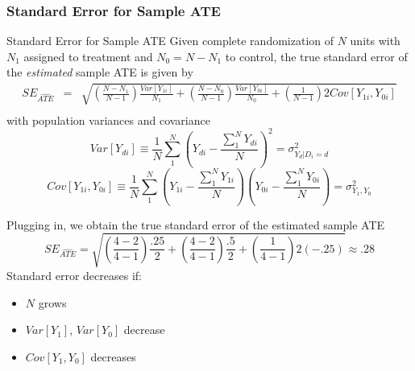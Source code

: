 \documentclass{beamer}
\numberwithin{equation}{section}
\begin{document}
\begin{frame}
  \frametitle{Standard Error for Sample ATE}


\scriptsize
\begin{block}{Standard Error for Sample ATE}
Given complete randomization of $N$ units with $N_1$ assigned to treatment and $N_0=N-N_1$ to control, the true standard error of the \emph{estimated} sample ATE is given by
 \begin{eqnarray*}
 SE_{\widehat{ATE}}&=&\sqrt{ \left( \frac{N-N_1}{N-1}\right) \frac{Var[Y_{1i}]}{N_1}+ \left( \frac{N-N_0}{N-1}\right) \frac{Var[Y_{0i}]}{N_0} + \left(\frac{1}{N-1} \right) 2Cov[Y_{1i},Y_{0i}]} \\
\end{eqnarray*}
with population variances and covariance
\[
Var[Y_{di}]\equiv\frac{1}{N}\sum_1^N\left(Y_{di}-\frac{\sum_1^N Y_{di}}{N}\right)^2=\sigma^2_{Y_{d}|D_i=d}
\]
\[
Cov[Y_{1i},Y_{0i}]\equiv\frac{1}{N} \sum_1^N \left(Y_{1i}-\frac{\sum_1^N Y_{1i}}{N}\right) \left(Y_{0i}-\frac{\sum_1^N Y_{0i}}{N}\right)=\sigma^2_{Y_1,Y_0}
\]
\end{block}
\begin{overprint}
Plugging in, we obtain the true standard error of the estimated sample ATE\[
 SE_{\widehat{ATE}}=\sqrt{ \left( \frac{4-2}{4-1}\right) \frac{.25}{2}+ \left( \frac{4-2}{4-1}\right) \frac{.5}{2} + \left(\frac{1}{4-1} \right) 2 (-.25)}  \approx .28
 \]
Standard error decreases if:
\begin{itemize}
\item $N$ grows
\item $Var[Y_1]$, $Var[Y_0]$ decrease
\item $Cov[Y_1,Y_0]$ decreases
\end{itemize}
\end{overprint}
\end{frame}
\end{document}
